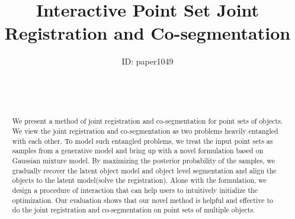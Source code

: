 

\title[Interactive Point Set Joint Registration and Co-segmentation]%
      {Interactive Point Set Joint Registration and Co-segmentation}

\author[Siyu Hu]
{\parbox{\textwidth}{\centering ID: paper1049}
        \\
{\parbox{\textwidth}{\centering \\
       } 
}
}

%





\maketitle
\begin{abstract}
We present a method of joint registration and co-segmentation for point sets of objects. We view the joint registration and co-segmentation as two problems heavily entangled with each other. To model such entangled problems, we treat the input point sets as samples from a generative model and bring up with a novel formulation based on Gaussian mixture model. By maximizing the posterior probability of the samples, we gradually recover the latent object model and object level segmentation and align the objects to the latent model(solve the registration). Alone with the formulation, we design a procedure of interaction that can help users to intuitively initialize the optimization. Our evaluation shows that our novel method is helpful and effective to do the joint registration and co-segmentation on point sets of multiple objects.    
\begin{classification} %
\end{classification}

\end{abstract}

